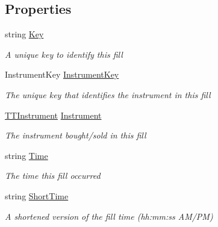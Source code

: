 \subsection*{Properties}
\begin{DoxyCompactItemize}
\item 
string \hyperlink{class_e_z_a_p_i_1_1_containers_1_1_t_t_fill_a376ab9b777c491649d9d788d60a71146}{Key}
\begin{DoxyCompactList}\small\item\em A unique key to identify this fill \end{DoxyCompactList}\item 
Instrument\-Key \hyperlink{class_e_z_a_p_i_1_1_containers_1_1_t_t_fill_a5c94d231f581f0513e0d3718bd6902b0}{Instrument\-Key}
\begin{DoxyCompactList}\small\item\em The unique key that identifies the instrument in this fill \end{DoxyCompactList}\item 
\hyperlink{class_e_z_a_p_i_1_1_containers_1_1_t_t_instrument}{T\-T\-Instrument} \hyperlink{class_e_z_a_p_i_1_1_containers_1_1_t_t_fill_aff7afdba3f06200534f129e91c73f6a7}{Instrument}
\begin{DoxyCompactList}\small\item\em The instrument bought/sold in this fill \end{DoxyCompactList}\item 
string \hyperlink{class_e_z_a_p_i_1_1_containers_1_1_t_t_fill_a15a9a18da888458ffc2780124287accd}{Time}
\begin{DoxyCompactList}\small\item\em The time this fill occurred \end{DoxyCompactList}\item 
string \hyperlink{class_e_z_a_p_i_1_1_containers_1_1_t_t_fill_af50ed198ec4cb47defb5a4466d89146b}{Short\-Time}
\begin{DoxyCompactList}\small\item\em A shortened version of the fill time (hh\-:mm\-:ss A\-M/\-P\-M) \end{DoxyCompactList}\item 

\end{DoxyCompactItemize}
